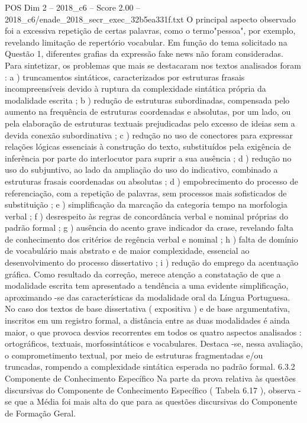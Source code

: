 \begin{textsample}{POS Dim 2 – 2018\_c6 – Score 2.00 – 2018\_c6/enade\_2018\_secr\_exec\_32b5ea331f.txt}
O principal aspecto observado foi a excessiva repetição de certas palavras, como o termo"pessoa", por exemplo, revelando limitação de repertório vocabular.
Em função do tema solicitado na Questão 1, diferentes grafias da expressão fake news não foram consideradas.
Para sintetizar, os problemas que mais se destacaram nos textos analisados foram : a ) truncamentos sintáticos, caracterizados por estruturas frasais incompreensíveis devido à ruptura da complexidade sintática própria da modalidade escrita ; b ) redução de estruturas subordinadas, compensada pelo aumento na frequência de estruturas coordenadas e absolutas, por um lado, ou pela elaboração de estruturas textuais prejudicadas pelo excesso de ideias sem a devida conexão subordinativa ; c ) redução no uso de conectores para expressar relações lógicas essenciais à construção do texto, substituídos pela exigência de inferência por parte do interlocutor para suprir a sua ausência ; d ) redução no uso do subjuntivo, ao lado da ampliação do uso do indicativo, combinado a estruturas frasais coordenadas ou absolutas ; d ) empobrecimento do processo de referenciação, com a repetição de palavras, sem processos mais sofisticados de substituição ; e ) simplificação da marcação da categoria tempo na morfologia verbal ; f ) desrespeito às regras de concordância verbal e nominal próprias do padrão formal ; g ) ausência do acento grave indicador da crase, revelando falta de conhecimento dos critérios de regência verbal e nominal ; h ) falta de domínio de vocabulário mais abstrato e de maior complexidade, essencial ao desenvolvimento do processo dissertativo ; i ) redução do emprego da acentuação gráfica.
Como resultado da correção, merece atenção a constatação de que a modalidade escrita tem apresentado a tendência a uma evidente simplificação, aproximando -se das características da modalidade oral da Língua Portuguesa.
No caso dos textos de base dissertativa ( expositiva ) e de base argumentativa, inscritos em um registro formal, a distância entre as duas modalidades é ainda maior, o que provoca desvios recorrentes em todos os quatro aspectos analisados : ortográficos, textuais, morfossintáticos e vocabulares.
Destaca -se, nessa avaliação, o comprometimento textual, por meio de estruturas fragmentadas e/ou truncadas, rompendo a complexidade sintática esperada no padrão formal. 6.3.2 Componente de Conhecimento Específico Na parte da prova relativa às questões discursivas do Componente de Conhecimento Específico ( Tabela 6.17 ), observa -se que a Média foi mais alta do que para as questões discursivas do Componente de Formação Geral.

\end{textsample}

